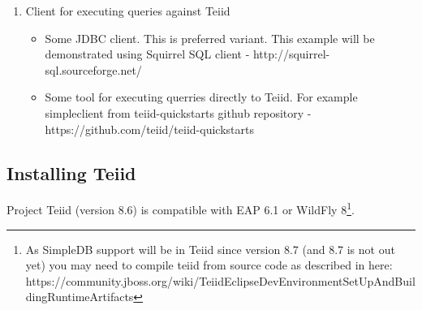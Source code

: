 \documentclass[oneside,12pt]{fithesis2}
\begin{document}
\begin{enumerate}
 \item Client for executing queries against Teiid
 \begin{itemize}
  \item Some JDBC client. This is preferred variant. This example will be demonstrated using Squirrel SQL client - http://squirrel-sql.sourceforge.net/
  \item Some tool for executing querries directly to Teiid. For example simpleclient from teiid-quickstarts github repository - https://github.com/teiid/teiid-quickstarts
 \end{itemize}
\end{enumerate}


\subsection*{Installing Teiid}
Project Teiid (version 8.6) is compatible with EAP 6.1 or WildFly 8\footnote{As SimpleDB support will be in Teiid since version 8.7 (and 8.7 is not out yet) you may need to compile teiid from source code as described in here: https://community.jboss.org/wiki/TeiidEclipseDevEnvironmentSetUpAndBuildingRuntimeArtifacts}.
\end{document}
